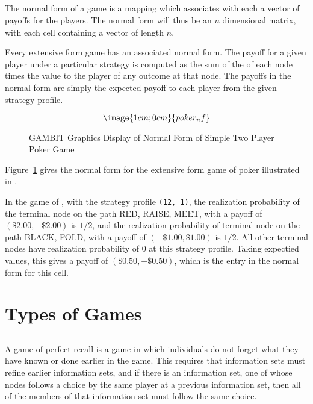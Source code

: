 \subsection{}\label{normformsec}
The normal form of a game is a mapping which associates with 
each  a vector of
 payoffs for the players.  The normal form will thus be an $n$ dimensional 
matrix, with each cell containing a vector of length $n$.

Every extensive form game has an associated normal form.  The payoff for 
a given player under a particular strategy is computed as the sum of the 
 of each node times the 
value to the player of any outcome at that node.  The payoffs in the normal 
form are simply the expected payoff to each player from the given strategy
 profile.  

\begin{figure}
$$\image{1cm;0cm}{poker_nf}$$
\caption{GAMBIT Graphics Display of Normal Form of
		Simple Two Player Poker Game}\label{fig_samp2}
\end{figure}

Figure~\ref{fig_samp2} gives the normal form for the extensive form game 
of poker illustrated in 
. 

In the game of  , with the 
strategy profile {\tt (12, 1)}, the realization probability of the terminal 
node on the path RED, RAISE, MEET, with a payoff of $(\$2.00, -\$2.00)$ 
is $1/2$, and the realization probability of terminal node on the path 
BLACK, FOLD, with a payoff of  $(-\$1.00, \$1.00)$ is $1/2$.    All other 
terminal nodes have realization probability of $0$ at this strategy profile.  
Taking expectied values, this gives a payoff of  
$(\$0.50, -\$0.50)$, which is the entry in the normal form for this cell.  

\section{Types of Games}
\subsection{}\label{perfrecallsec}
A game of perfect recall is a game in which individuals do not forget what
they have known or done earlier in the game.  This requires that
information sets must refine earlier information sets, and if there is
an information set, one of whose nodes follows a choice by the same player
at a previous information set, then all of the members of that information
set must follow the same choice.

